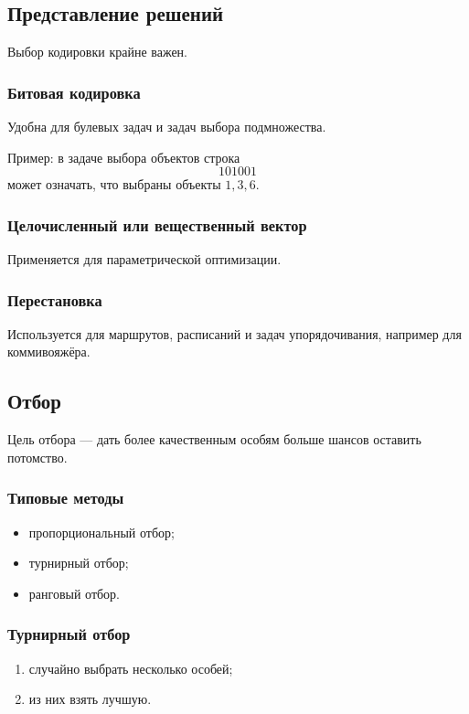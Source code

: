 \documentclass[12pt,a4paper]{article}
\theoremstyle{definition}
\theoremstyle{plain}
\begin{document}
\subsection{Представление решений}
Выбор кодировки крайне важен.

\subsubsection{Битовая кодировка}
Удобна для булевых задач и задач выбора подмножества.

Пример: в задаче выбора объектов строка
\[
101001
\]
может означать, что выбраны объекты $1,3,6$.

\subsubsection{Целочисленный или вещественный вектор}
Применяется для параметрической оптимизации.

\subsubsection{Перестановка}
Используется для маршрутов, расписаний и задач упорядочивания, например для коммивояжёра.

\subsection{Отбор}
Цель отбора --- дать более качественным особям больше шансов оставить потомство.

\subsubsection{Типовые методы}
\begin{itemize}
\item пропорциональный отбор;
\item турнирный отбор;
\item ранговый отбор.
\end{itemize}

\subsubsection{Турнирный отбор}
\begin{enumerate}
\item случайно выбрать несколько особей;
\item из них взять лучшую.
\end{enumerate}
\end{document}
